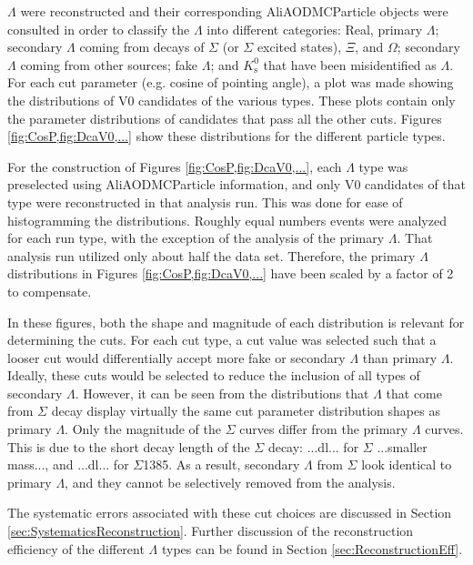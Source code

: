 $\Lambda$ were reconstructed and their corresponding AliAODMCParticle objects were consulted in order to classify the $\Lambda$ into different categories: Real, primary $\Lambda$; secondary $\Lambda$ coming from decays of $\Sigma$ (or $\Sigma$ excited states), $\Xi$, and $\Omega$; secondary $\Lambda$ coming from other sources; fake $\Lambda$; and $K^0_\mathrm{s}$ that have been misidentified as $\Lambda$.  For each cut parameter (e.g. cosine of pointing angle), a plot was made showing the distributions of V0 candidates of the various types.  These plots contain only the parameter distributions of candidates that pass all the other cuts.  Figures \ref{fig:CosP,fig:DcaV0,...} show these distributions for the different particle types.  

\begin{figure}
\end{figure}

For the construction of Figures \ref{fig:CosP,fig:DcaV0,...}, each $\Lambda$ type was preselected using AliAODMCParticle information, and only V0 candidates of that type were reconstructed in that analysis run. This was done for ease of histogramming the distributions.  Roughly equal numbers events were analyzed for each run type, with the exception of the analysis of the primary $\Lambda$.  That analysis run utilized only about half the data set.  Therefore, the primary $\Lambda$ distributions in Figures \ref{fig:CosP,fig:DcaV0,...} have been scaled by a factor of 2 to compensate.

In these figures, both the shape and magnitude of each distribution is relevant for determining the cuts. For each cut type, a cut value was selected such that a looser cut would differentially accept more fake or secondary $\Lambda$ than primary $\Lambda$. Ideally, these cuts would be selected to reduce the inclusion of all types of secondary $\Lambda$.  However, it can be seen from the distributions that $\Lambda$ that come from $\Sigma$ decay display virtually the same cut parameter distribution shapes as primary $\Lambda$.  Only the magnitude of the $\Sigma$ curves differ from the primary $\Lambda$ curves.  This is due to the short decay length of the $\Sigma$ decay: ...dl... for $\Sigma$ ...smaller mass..., and ...dl... for $\Sigma$1385. As a result, secondary $\Lambda$ from $\Sigma$ look identical to primary $\Lambda$, and they cannot be selectively removed from the analysis.

The systematic errors associated with these cut choices are discussed in Section \ref{sec:SystematicsReconstruction}. Further discussion of the reconstruction efficiency of the different $\Lambda$ types can be found in Section \ref{sec:ReconstructionEff}.

